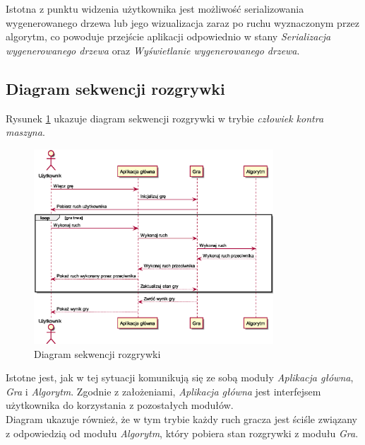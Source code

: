 \documentclass{article}
\newcommand{\modulename}[1]{\textit{#1}}
\begin{document}
	\noindent Istotna z punktu widzenia użytkownika jest możliwość serializowania wygenerowanego drzewa lub jego wizualizacja zaraz po ruchu wyznaczonym przez algorytm, co powoduje przejście aplikacji odpowiednio w stany \modulename{Serializacja wygenerowanego drzewa} oraz \modulename{Wyświetlanie wygenerowanego drzewa}.
	\clearpage
	
	\subsection{Diagram sekwencji rozgrywki}
	Rysunek \ref{rys:sequencegame} ukazuje diagram sekwencji rozgrywki w trybie \modulename{człowiek kontra maszyna}.
	\begin{figure}[h]
		\centering
		\includegraphics[width=0.8\textwidth]{play_with_pc_sequence}
		\caption{Diagram sekwencji rozgrywki}
		\label{rys:sequencegame}
	\end{figure}

	\noindent Istotne jest, jak w tej sytuacji komunikują się ze sobą moduły \modulename{Aplikacja główna}, \modulename{Gra} i \modulename{Algorytm}. Zgodnie z założeniami, \modulename{Aplikacja główna} jest interfejsem użytkownika do korzystania z pozostałych modułów.\\
	
	\noindent Diagram ukazuje również, że w tym trybie każdy ruch gracza jest ściśle związany z odpowiedzią od modułu \modulename{Algorytm}, który pobiera stan rozgrywki z modułu \modulename{Gra}.
	
	\clearpage
\end{document}
